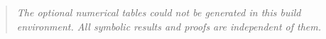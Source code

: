 \begin{quote}\emph{The optional numerical tables could not be generated in this build environment.  All symbolic results and proofs are independent of them.}\end{quote}
